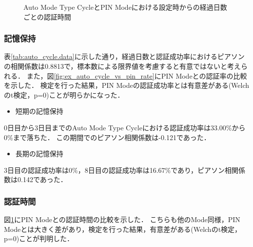 \begin{figure}[b]
  \begin{center}
  \end{center}
  \caption{Auto Mode Type CycleとPIN Modeにおける設定時からの経過日数ごとの認証時間}
  \label{fig:ex_auto_cycle_vs_pin_time}
\end{figure}

\subsubsection{記憶保持}
表\ref{tab:auto_cycle.data}に示した通り，経過日数と認証成功率におけるピアソンの相関係数は0.8813で，標本数による限界値を考慮すると有意ではないと考えられる．
また，図\ref{fig:ex_auto_cycle_vs_pin_rate}にPIN Modeとの認証率の比較を示した．
検定を行った結果，PIN Modeの認証成功率とは有意差がある(Welchのt検定，p=0)ことが明らかになった．
\begin{itemize}
  \item 短期の記憶保持
\end{itemize}
0日目から3日目までのAuto Mode Type Cycleにおける認証成功率は33.00\%から0\%まで落ちた．
この期間でのピアソン相関係数は-0.121であった．

\begin{itemize}
  \item 長期の記憶保持
\end{itemize}
3日目の認証成功率は0\%，8日目の認証成功率は16.67\%であり，ピアソン相関係数は0.142であった．

\subsubsection{認証時間}
図\ref{fig:ex_auto_cycle_vs_pin_time}にPIN Modeとの認証時間の比較を示した．
こちらも他のMode同様，PIN Modeとは大きく差があり，検定を行った結果，有意差がある(Welchのt検定，p=0)ことが判明した．

